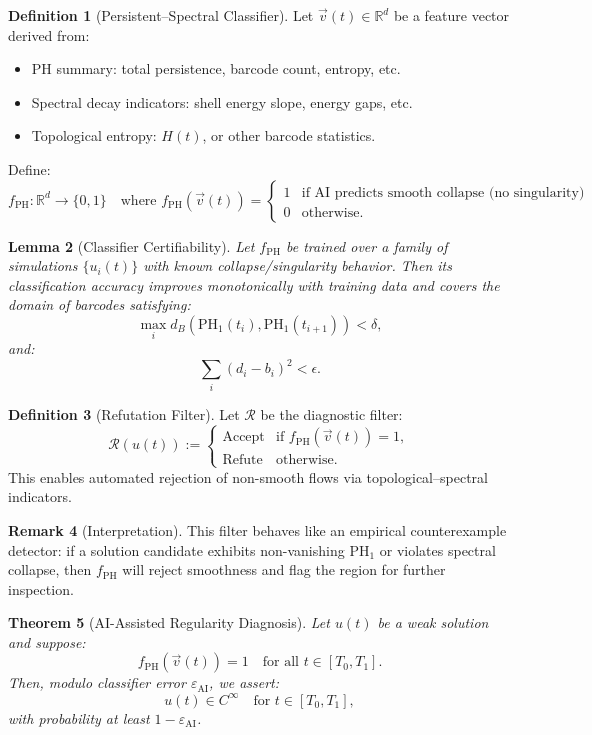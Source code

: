 \documentclass[11pt]{article}
\newtheorem{theorem}{Theorem}[section]
\newtheorem{lemma}[theorem]{Lemma}
\theoremstyle{definition}
\newtheorem{definition}[theorem]{Definition}
\newtheorem{remark}[theorem]{Remark}
\begin{document}
\begin{definition}[Persistent–Spectral Classifier]
Let $\vec{v}(t) \in \mathbb{R}^d$ be a feature vector derived from:
\begin{itemize}
  \item PH summary: total persistence, barcode count, entropy, etc.
  \item Spectral decay indicators: shell energy slope, energy gaps, etc.
  \item Topological entropy: $H(t)$, or other barcode statistics.
\end{itemize}
Define:
\[
f_{\mathrm{PH}} : \mathbb{R}^d \to \{0,1\}
\quad \text{where } f_{\mathrm{PH}}(\vec{v}(t)) = 
\begin{cases}
1 & \text{if AI predicts smooth collapse (no singularity)} \\
0 & \text{otherwise}.
\end{cases}
\]
\end{definition}

\begin{lemma}[Classifier Certifiability]
Let $f_{\mathrm{PH}}$ be trained over a family of simulations $\{ u_i(t) \}$ with known collapse/singularity behavior.  
Then its classification accuracy improves monotonically with training data and covers the domain of barcodes satisfying:
\[
\max_i d_B(\mathrm{PH}_1(t_i), \mathrm{PH}_1(t_{i+1})) < \delta,
\]
and:
\[
\sum_i (d_i - b_i)^2 < \epsilon.
\]
\end{lemma}

\begin{definition}[Refutation Filter]
Let $\mathcal{R}$ be the diagnostic filter:
\[
\mathcal{R}(u(t)) := 
\begin{cases}
\text{Accept} & \text{if } f_{\mathrm{PH}}(\vec{v}(t)) = 1, \\
\text{Refute} & \text{otherwise}.
\end{cases}
\]
This enables automated rejection of non-smooth flows via topological–spectral indicators.
\end{definition}

\begin{remark}[Interpretation]
This filter behaves like an empirical counterexample detector:  
if a solution candidate exhibits non-vanishing $\mathrm{PH}_1$ or violates spectral collapse,  
then $f_{\mathrm{PH}}$ will reject smoothness and flag the region for further inspection.
\end{remark}

\begin{theorem}[AI-Assisted Regularity Diagnosis]
Let $u(t)$ be a weak solution and suppose:
\[
f_{\mathrm{PH}}(\vec{v}(t)) = 1 \quad \text{for all } t \in [T_0, T_1].
\]
Then, modulo classifier error $\varepsilon_\mathrm{AI}$, we assert:
\[
u(t) \in C^\infty \quad \text{for } t \in [T_0, T_1],
\]
with probability at least $1 - \varepsilon_\mathrm{AI}$.
\end{theorem}
\end{document}
